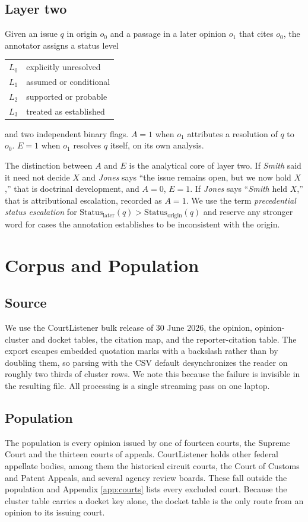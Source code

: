 \documentclass[11pt]{article}
\begin{document}
\subsection{Layer two} Given an issue $q$ in origin $o_0$ and a passage in a
later opinion $o_1$ that cites $o_0$, the annotator assigns a status level
\begin{center}
\begin{tabular}{ll}
$L_0$ & explicitly unresolved \\
$L_1$ & assumed or conditional \\
$L_2$ & supported or probable \\
$L_3$ & treated as established \\
\end{tabular}
\end{center}
and two independent binary flags. $A=1$ when $o_1$ attributes a resolution of $q$
to $o_0$. $E=1$ when $o_1$ resolves $q$ itself, on its own analysis.

The distinction between $A$ and $E$ is the analytical core of layer two. If
\emph{Smith} said it need not decide $X$ and \emph{Jones} says ``the issue
remains open, but we now hold $X$,'' that is doctrinal development, and $A=0$,
$E=1$. If \emph{Jones} says ``\emph{Smith} held $X$,'' that is attributional
escalation, recorded as $A=1$. We use the term \emph{precedential status
escalation} for
$\mathrm{Status}_{\text{later}}(q) > \mathrm{Status}_{\text{origin}}(q)$ and
reserve any stronger word for cases the annotation establishes to be inconsistent
with the origin.

\section{Corpus and Population}
\label{sec:corpus}

\subsection{Source} We use the CourtListener bulk release of 30 June 2026, the
opinion, opinion-cluster and docket tables, the citation map, and the
reporter-citation table. The export escapes embedded quotation marks with a
backslash rather than by doubling them, so parsing with the CSV default
desynchronizes the reader on roughly two thirds of cluster rows. We note this
because the failure is invisible in the resulting file. All processing is a
single streaming pass on one laptop.

\subsection{Population} The population is every opinion issued by one of fourteen
courts, the Supreme Court and the thirteen courts of appeals. CourtListener holds
other federal appellate bodies, among them the historical circuit courts, the
Court of Customs and Patent Appeals, and several agency review boards. These fall
outside the population and Appendix \ref{app:courts} lists every excluded court.
Because the cluster table carries a docket key alone, the docket table is the
only route from an opinion to its issuing court.
\end{document}
